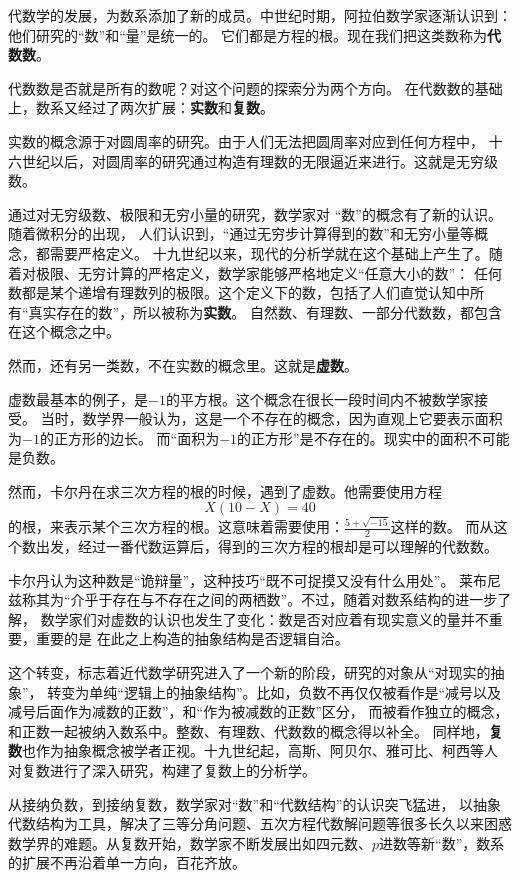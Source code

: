 \documentclass[12pt,UTF8]{ctexbook}
\begin{document}
\begin{appendix}
代数学的发展，为数系添加了新的成员。中世纪时期，阿拉伯数学家逐渐认识到：他们研究的“数”和“量”是统一的。
它们都是方程的根。现在我们把这类数称为\textbf{代数数}。

代数数是否就是所有的数呢？对这个问题的探索分为两个方向。
在代数数的基础上，数系又经过了两次扩展：\textbf{实数}和\textbf{复数}。

实数的概念源于对圆周率的研究。由于人们无法把圆周率对应到任何方程中，
十六世纪以后，对圆周率的研究通过构造有理数的无限逼近来进行。这就是无穷级数。

通过对无穷级数、极限和无穷小量的研究，数学家对
“数”的概念有了新的认识。随着微积分的出现，
人们认识到，“通过无穷步计算得到的数”和无穷小量等概念，都需要严格定义。
十九世纪以来，现代的分析学就在这个基础上产生了。随着对极限、无穷计算的严格定义，数学家能够严格地定义“任意大小的数”：
任何数都是某个递增有理数列的极限。这个定义下的数，包括了人们直觉认知中所有“真实存在的数”，所以被称为\textbf{实数}。
自然数、有理数、一部分代数数，都包含在这个概念之中。

然而，还有另一类数，不在实数的概念里。这就是\textbf{虚数}。

虚数最基本的例子，是$-1$的平方根。这个概念在很长一段时间内不被数学家接受。
当时，数学界一般认为，这是一个不存在的概念，因为直观上它要表示面积为$-1$的正方形的边长。
而“面积为$-1$的正方形”是不存在的。现实中的面积不可能是负数。

然而，卡尔丹在求三次方程的根的时候，遇到了虚数。他需要使用方程
$$X(10 - X) = 40$$
的根，来表示某个三次方程的根。这意味着需要使用：$\frac{5 + \sqrt{-15}}{2}$这样的数。
而从这个数出发，经过一番代数运算后，得到的三次方程的根却是可以理解的代数数。

卡尔丹认为这种数是“诡辩量”，这种技巧“既不可捉摸又没有什么用处”。
莱布尼兹称其为“介乎于存在与不存在之间的两栖数”。不过，随着对数系结构的进一步了解，
数学家们对虚数的认识也发生了变化：数是否对应着有现实意义的量并不重要，重要的是
在此之上构造的抽象结构是否逻辑自洽。

这个转变，标志着近代数学研究进入了一个新的阶段，研究的对象从“对现实的抽象”，
转变为单纯“逻辑上的抽象结构”。比如，负数不再仅仅被看作是“减号以及减号后面作为减数的正数”，和“作为被减数的正数”区分，
而被看作独立的概念，和正数一起被纳入数系中。整数、有理数、代数数的概念得以补全。
同样地，\textbf{复数}也作为抽象概念被学者正视。十九世纪起，高斯、阿贝尔、雅可比、柯西等人
对复数进行了深入研究，构建了复数上的分析学。

从接纳负数，到接纳复数，数学家对“数”和“代数结构”的认识突飞猛进，
以抽象代数结构为工具，解决了三等分角问题、五次方程代数解问题等很多长久以来困惑数学界的难题。从复数开始，数学家不断发展出如四元数、$p$进数等新“数”，数系的扩展不再沿着单一方向，百花齐放。


\end{appendix}
\end{document}
